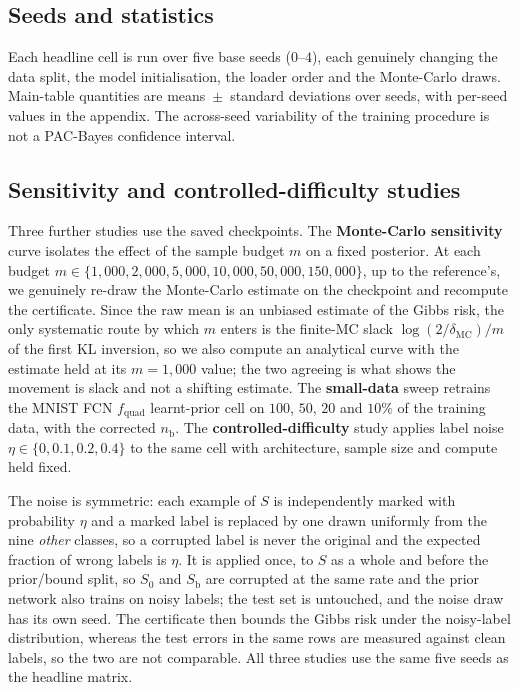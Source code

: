 \subsection{Seeds and statistics}\label{sec:seeds}

Each headline cell is run over five base seeds ($0$--$4$), each genuinely
changing the data split, the model initialisation, the loader order and the
Monte-Carlo draws. Main-table quantities are means~$\pm$~standard deviations over
seeds, with per-seed values in the appendix. The across-seed variability of the
training procedure is not a PAC-Bayes confidence interval.

\subsection{Sensitivity and controlled-difficulty studies}\label{sec:studies}

Three further studies use the saved checkpoints. The \textbf{Monte-Carlo
sensitivity} curve isolates the effect of the sample budget $m$ on a fixed
posterior. At each budget
$m\in\{1{,}000,\allowbreak 2{,}000,\allowbreak 5{,}000,\allowbreak 10{,}000,\allowbreak 50{,}000,\allowbreak 150{,}000\}$, up to the
reference's, we genuinely re-draw the Monte-Carlo estimate on the checkpoint and
recompute the certificate. Since the raw mean is an unbiased estimate of the
Gibbs risk, the only systematic route by which $m$ enters is the finite-MC slack
$\log(2/\delta_{\mathrm{MC}})/m$ of the first KL inversion, so we also compute an
analytical curve with the estimate held at its $m=1{,}000$ value; the two
agreeing is what shows the movement is slack and not a shifting estimate. The \textbf{small-data} sweep retrains the MNIST
FCN $f_{\text{quad}}$ learnt-prior cell on $100$, $50$, $20$ and $10\%$ of the
training data, with the corrected $n_{\mathrm b}$. The \textbf{controlled-difficulty} study
applies label noise $\eta\in\{0,0.1,0.2,0.4\}$ to the same cell with
architecture, sample size and compute held fixed.

The noise is symmetric: each example of $S$ is independently marked with
probability $\eta$ and a marked label is replaced by one drawn uniformly from the
nine \emph{other} classes, so a corrupted label is never the original and the
expected fraction of wrong labels is $\eta$. It is applied once, to $S$ as a whole
and before the prior/bound split, so $S_0$ and $S_{\mathrm b}$ are corrupted at
the same rate and the prior network also trains on noisy labels; the test set is
untouched, and the noise draw has its own seed. The certificate then bounds the
Gibbs risk under the
noisy-label distribution, whereas the test errors in the same rows are measured
against clean labels, so the two are not comparable. All three studies use the
same five seeds as the headline matrix.

